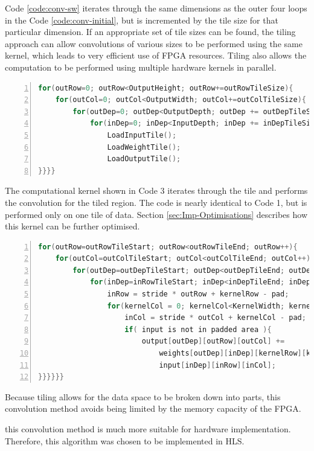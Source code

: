 \documentclass[12pt]{article}
\begin{document}
Code \ref{code:conv-sw} iterates through the same dimensions as the outer four loops in the Code \ref{code:conv-initial}, but is incremented by the tile size for that particular dimension. If an appropriate set of tile sizes can be found, the tiling approach can allow convolutions of various sizes to be performed using the same kernel, which leads to very efficient use of FPGA resources. Tiling also allows the computation to be performed using multiple hardware kernels in parallel.

\renewcommand{\lstlistingname}{Code}
\begin{lstlisting}[frame=single, caption=External Data Transfer, label=code:conv-sw, captionpos=b, numbers=left, language=C]
for(outRow=0; outRow<OutputHeight; outRow+=outRowTileSize){
	for(outCol=0; outCol<OutputWidth; outCol+=outColTileSize){
		for(outDep=0; outDep<OutputDepth; outDep += outDepTileSize){
			for(inDep=0; inDep<InputDepth; inDep += inDepTileSize){
				LoadInputTile();
				LoadWeightTile();
				LoadOutputTile();
}}}}
\end{lstlisting} 

The computational kernel shown in Code 3 iterates through the tile and performs the convolution for the tiled region. The code is nearly identical to Code 1, but is performed only on one tile of data. Section \ref{sec:Imp-Optimisations} describes how this kernel can be further optimised.

\renewcommand{\lstlistingname}{Code}
\begin{lstlisting}[frame=single, caption=Computational Kernel, label=code:conv-hw1, captionpos=b, numbers=left, language=C]
for(outRow=outRowTileStart; outRow<outRowTileEnd; outRow++){
	for(outCol=outColTileStart; outCol<outColTileEnd; outCol++){
		for(outDep=outDepTileStart; outDep<outDepTileEnd; outDep++){
			for(inDep=inRowTileStart; inDep<inDepTileEnd; inDep++){
				inRow = stride * outRow + kernelRow - pad;
				for(kernelCol = 0; kernelCol<KernelWidth; kernelCol++){
					inCol = stride * outCol + kernelCol - pad;
					if( input is not in padded area ){
						output[outDep][outRow][outCol] +=
							weights[outDep][inDep][kernelRow][kernelCol] *
							input[inDep][inRow][inCol];
}}}}}}
\end{lstlisting} 

Because tiling allows for the data space to be broken down into parts, this convolution method avoids being limited by the memory capacity of the FPGA. 

 this convolution method is much more suitable for hardware implementation. Therefore, this algorithm was chosen to be implemented in HLS.
\end{document}

